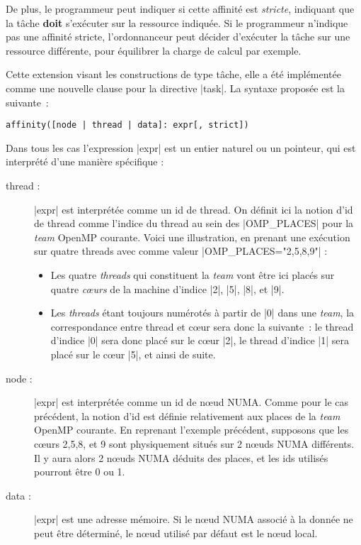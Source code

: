 De plus, le programmeur peut indiquer si cette affinité est \emph{stricte}, indiquant que la tâche \textbf{doit} s'exécuter sur la ressource indiquée.
Si le programmeur n'indique pas une affinité stricte, l'ordonnanceur peut décider d'exécuter la tâche sur une ressource différente, pour équilibrer la charge de calcul par exemple.

Cette extension visant les constructions de type tâche, elle a été implémentée comme une nouvelle clause pour la directive |task|. La syntaxe proposée est la suivante~:

\begin{lstlisting}
affinity([node | thread | data]: expr[, strict])
\end{lstlisting}

Dans tous les cas l'expression |expr| est un entier naturel ou un pointeur, qui est interprété d'une manière spécifique :

\begin{description}
  \item [thread :]
    |expr| est interprétée comme un id de thread. On définit ici la notion d'id de thread comme l'indice du thread au sein des |OMP_PLACES| pour la \textit{team} OpenMP courante.
    Voici une illustration, en prenant une exécution sur quatre threads avec comme valeur |OMP_PLACES="{2},{5},{8},{9}"| :
    \begin{itemize}
      \item Les quatre \emph{threads} qui constituent la \emph{team} vont être ici placés sur quatre \emph{cœurs} de la machine d'indice |2|, |5|, |8|, et |9|.
      \item Les \emph{threads} étant toujours numérotés à partir de |0| dans une \emph{team}, la correspondance entre thread et cœur sera donc la suivante~: le thread d'indice |0| sera donc placé sur le cœur |2|, le thread d'indice |1| sera placé sur le cœur |5|, et ainsi de suite.
    \end{itemize}
  \item [node :]
    |expr| est interprétée comme un id de nœud NUMA. Comme pour le cas précédent, la notion d'id est définie relativement aux places de la \textit{team} OpenMP courante.
    En reprenant l'exemple précédent, supposons que les cœurs 2,5,8, et 9 sont physiquement situés sur 2 nœuds NUMA différents. Il y aura alors 2 nœuds NUMA déduits des places, et les ids utilisés pourront être 0 ou 1.
  \item [data :]
    |expr| est une adresse mémoire. Si le nœud NUMA associé à la donnée ne peut être déterminé, le nœud utilisé par défaut est le nœud local.
\end{description}

